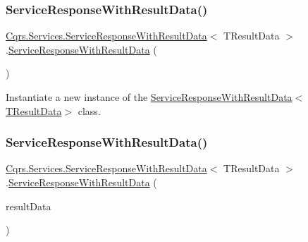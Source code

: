 \subsubsection{\texorpdfstring{Service\+Response\+With\+Result\+Data()}{ServiceResponseWithResultData()}\hspace{0.1cm}{\footnotesize\ttfamily [1/2]}}
{\footnotesize\ttfamily \hyperlink{classCqrs_1_1Services_1_1ServiceResponseWithResultData}{Cqrs.\+Services.\+Service\+Response\+With\+Result\+Data}$<$ T\+Result\+Data $>$.\hyperlink{classCqrs_1_1Services_1_1ServiceResponseWithResultData}{Service\+Response\+With\+Result\+Data} (\begin{DoxyParamCaption}{ }\end{DoxyParamCaption})}



Instantiate a new instance of the \hyperlink{classCqrs_1_1Services_1_1ServiceResponseWithResultData_a4241511df21804b73baec2b0c2e66402_a4241511df21804b73baec2b0c2e66402}{Service\+Response\+With\+Result\+Data$<$\+T\+Result\+Data$>$} class. 

\mbox{\label{classCqrs_1_1Services_1_1ServiceResponseWithResultData_a63a840d449e8b06652130ffb1228432d_a63a840d449e8b06652130ffb1228432d}} 
\subsubsection{\texorpdfstring{Service\+Response\+With\+Result\+Data()}{ServiceResponseWithResultData()}\hspace{0.1cm}{\footnotesize\ttfamily [2/2]}}
{\footnotesize\ttfamily \hyperlink{classCqrs_1_1Services_1_1ServiceResponseWithResultData}{Cqrs.\+Services.\+Service\+Response\+With\+Result\+Data}$<$ T\+Result\+Data $>$.\hyperlink{classCqrs_1_1Services_1_1ServiceResponseWithResultData}{Service\+Response\+With\+Result\+Data} (\begin{DoxyParamCaption}\item[{T\+Result\+Data}]{result\+Data }\end{DoxyParamCaption})}



